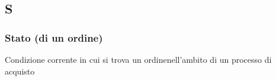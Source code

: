 \subsection{S}
\subsubsection{Stato (di un ordine)}
Condizione corrente in cui si trova un ordine\g nell'ambito di un processo di acquisto



